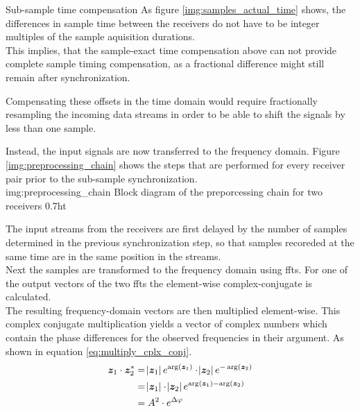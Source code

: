 \begin{subchapter}{Sub-sample time compensation}
  As figure \ref{img:samples_actual_time} shows, the
  differences in sample time between the receivers do not
  have to be integer multiples of the sample aquisition durations. \\

  This implies, that the sample-exact time compensation above
  can not provide complete sample timing compensation, as
  a fractional difference might still remain after synchronization.

  Compensating these offsets in the time domain would
  require fractionally resampling the incoming data streams
  in order to be able to shift the signals by less than
  one sample.

  Instead, the input signals are now transferred to the
  frequency domain. Figure \ref{img:preprocessing_chain}
  shows the steps that are performed for every receiver pair prior to
  the sub-sample synchronization. \\

               {img:preprocessing_chain}
               {Block diagram of the preporcessing chain for two receivers}
               {0.7}{ht}

  The input streams from the receivers are first delayed
  by the number of samples determined in the previous
  synchronization step, so that samples recoreded at the
  same time are in the same position in the streams. \\

  Next the samples are transformed to the frequency domain
  using \glspl{fft}.
  For one of the output vectors of the two \glspl{fft} the
  element-wise complex-conjugate is calculated. \\

  The resulting frequency-domain vectors are then
  multiplied element-wise. This complex conjugate multiplication
  yields a vector of complex numbers which contain the
  phase differences for the observed frequencies in
  their argument. As shown in equation
  \ref{eq:multiply_cplx_conj}. \\

  \begin{equation}
    \label{eq:multiply_cplx_conj}
    \begin{split}
      \bm{z}_\text{1} \cdot \bm{z}_\text{2}^{\ast}
      & = \abs{\bm{z}_\text{1}} e^{\arg(\bm{z}_\text{1})}
        \cdot
        \abs{\bm{z}_\text{2}} e^{-\arg(\bm{z}_\text{2})} \\
      & = \abs{\bm{z}_\text{1}} \cdot \abs{\bm{z}_\text{2}}
        e^{\arg(\bm{z}_\text{1}) - \arg(\bm{z}_\text{2})} \\
      & = A^{2} \cdot e^{\Delta \varphi}
    \end{split}
  \end{equation}


\end{subchapter}
